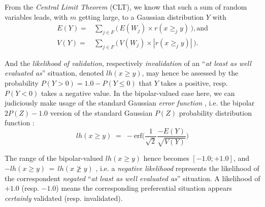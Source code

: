 From the \emph{Central Limit Theorem} (CLT), we know that such a sum of random variables leads, with $m$ getting large, to a Gaussian distribution $Y$ with
\begin{eqnarray}
E(Y ) = &\sum_{j \in F} \big(\,E(W_j) \times r(x \geq_j y)\,\big), \text{and}\\
V(Y) = &\sum_{j \in F} \big(\,V(W_j)\times |r(x \geq_j y)|\,\big).
\end{eqnarray}

And the \emph{likelihood of validation}, respectively \emph{invalidation} of an ``\emph{at least as well evaluated as}'' situation, denoted $lh(x \geq y)$,  may hence be assessed by the probability $P(Y > 0) = 1.0 - P(Y \leq 0)$ that $Y$ takes a positive, resp. $P(Y < 0)$ takes a negative value. In the bipolar-valued case here, we can judiciously make usage of the standard Gaussian \emph{error function} , i.e. the bipolar $2P(Z) - 1.0$ version of the standard Gaussian $P(Z)$ probability distribution function \citep{NR3-2007-6}:
\begin{equation}
  lh(x \geq y) \;=\; -\text{erf}\big(\frac{1}{\sqrt{2}}\frac{-E(Y)}{\sqrt{V(Y)}} \big)
\end{equation}

The range of the bipolar-valued $lh(x \geq y)$ hence becomes $[-1.0;+1.0]$, and $-lh(x \geq y) \,=\, lh(x \not\geq y)$ , i.e. a \emph{negative likelihood} represents the likelihood of the correspondent \emph{negated} ``\emph{at least as well evaluated as}'' situation. A likelihood of $+1.0$ (resp. $-1.0$) means the corresponding preferential situation appears \emph{certainly} validated (resp. invalidated).

